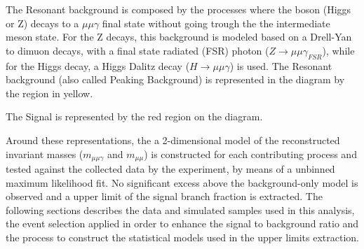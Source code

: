 The Resonant background is composed by the processes where the boson (Higgs or Z) decays to a $\mu\mu\gamma$ final state without going trough the the intermediate meson state. For the Z decays, this background is modeled based on a Drell-Yan to dimuon decays, with a final state radiated (FSR) photon ($Z \rightarrow \mu\mu\gamma_{FSR}$), while for the Higgs decay, a  Higgs Dalitz decay ($H \rightarrow \mu\mu\gamma$) is used. The Resonant background (also called Peaking Background) is represented in the diagram by the region in yellow.

The Signal is represented by the red region on the diagram.

Around these representations, the a 2-dimensional model of the reconstructed invariant masses ($m_{\mu\mu\gamma}$ and $m_{\mu\mu}$) is constructed for each contributing process and tested against the collected data by the experiment, by means of a unbinned maximum likelihood fit. No significant excess above the background-only model is observed and a upper limit of the signal branch fraction is extracted. The following sections describes the data and simulated samples used in this analysis, the event selection applied in order to enhance the signal to background ratio and the process to construct the statistical models used in the upper limits extraction.
